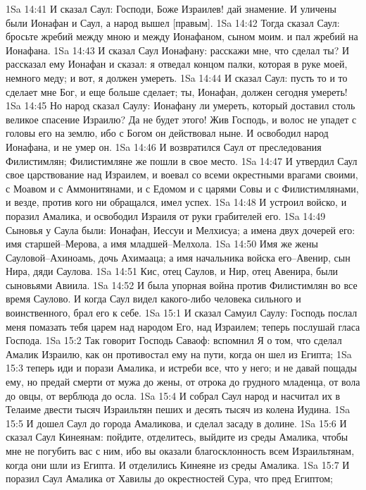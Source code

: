 1Sa 14:41  И сказал Саул: Господи, Боже Израилев! дай знамение. И уличены были Ионафан и Саул, а народ вышел [правым].
1Sa 14:42  Тогда сказал Саул: бросьте жребий между мною и между Ионафаном, сыном моим. и пал жребий на Ионафана.
1Sa 14:43  И сказал Саул Ионафану: расскажи мне, что сделал ты? И рассказал ему Ионафан и сказал: я отведал концом палки, которая в руке моей, немного меду; и вот, я должен умереть.
1Sa 14:44  И сказал Саул: пусть то и то сделает мне Бог, и еще больше сделает; ты, Ионафан, должен сегодня умереть!
1Sa 14:45  Но народ сказал Саулу: Ионафану ли умереть, который доставил столь великое спасение Израилю? Да не будет этого! Жив Господь, и волос не упадет с головы его на землю, ибо с Богом он действовал ныне. И освободил народ Ионафана, и не умер он.
1Sa 14:46  И возвратился Саул от преследования Филистимлян; Филистимляне же пошли в свое место.
1Sa 14:47  И утвердил Саул свое царствование над Израилем, и воевал со всеми окрестными врагами своими, с Моавом и с Аммонитянами, и с Едомом и с царями Совы и с Филистимлянами, и везде, против кого ни обращался, имел успех.
1Sa 14:48  И устроил войско, и поразил Амалика, и освободил Израиля от руки грабителей его.
1Sa 14:49  Сыновья у Саула были: Ионафан, Иессуи и Мелхисуа; а имена двух дочерей его: имя старшей--Мерова, а имя младшей--Мелхола.
1Sa 14:50  Имя же жены Сауловой--Ахиноамь, дочь Ахимааца; а имя начальника войска его--Авенир, сын Нира, дяди Саулова.
1Sa 14:51  Кис, отец Саулов, и Нир, отец Авенира, были сыновьями Авиила.
1Sa 14:52  И была упорная война против Филистимлян во все время Саулово. И когда Саул видел какого-либо человека сильного и воинственного, брал его к себе.
1Sa 15:1  И сказал Самуил Саулу: Господь послал меня помазать тебя царем над народом Его, над Израилем; теперь послушай гласа Господа.
1Sa 15:2  Так говорит Господь Саваоф: вспомнил Я о том, что сделал Амалик Израилю, как он противостал ему на пути, когда он шел из Египта;
1Sa 15:3  теперь иди и порази Амалика, и истреби все, что у него; и не давай пощады ему, но предай смерти от мужа до жены, от отрока до грудного младенца, от вола до овцы, от верблюда до осла.
1Sa 15:4  И собрал Саул народ и насчитал их в Телаиме двести тысяч Израильтян пеших и десять тысяч из колена Иудина.
1Sa 15:5  И дошел Саул до города Амаликова, и сделал засаду в долине.
1Sa 15:6  И сказал Саул Кинеянам: пойдите, отделитесь, выйдите из среды Амалика, чтобы мне не погубить вас с ним, ибо вы оказали благосклонность всем Израильтянам, когда они шли из Египта. И отделились Кинеяне из среды Амалика.
1Sa 15:7  И поразил Саул Амалика от Хавилы до окрестностей Сура, что пред Египтом;
